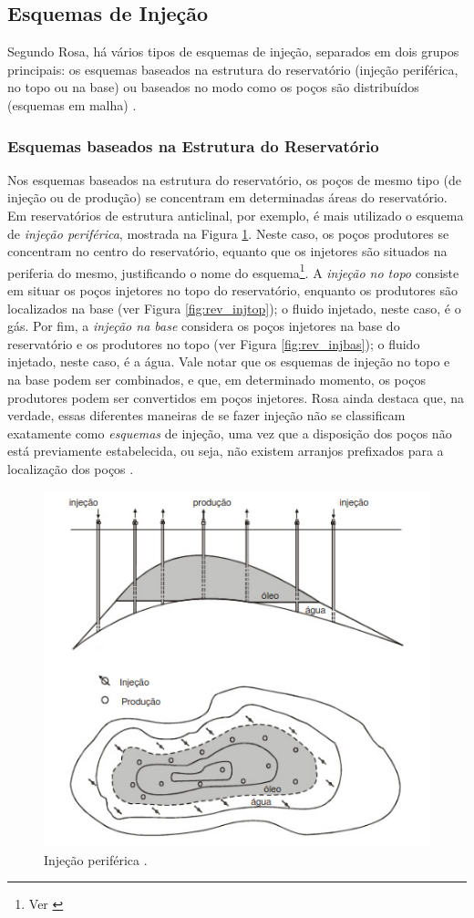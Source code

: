 \subsection{Esquemas de Injeção}
Segundo Rosa, há vários tipos de esquemas de injeção, separados em dois grupos principais: os esquemas baseados na estrutura do reservatório (injeção periférica, no topo ou na base) ou baseados no modo como os poços são distribuídos (esquemas em malha) \cite[p. 564]{engres}.

\subsubsection{Esquemas baseados na Estrutura do Reservatório}
Nos esquemas baseados na estrutura do reservatório, os poços de mesmo tipo (de injeção ou de produção) se concentram em determinadas áreas do reservatório. Em reservatórios de estrutura anticlinal, por exemplo, é mais utilizado o esquema de \textit{injeção periférica}, mostrada na Figura \ref{fig:rev_injper}. Neste caso, os poços produtores se concentram no centro do reservatório, equanto que os injetores são situados na periferia do mesmo, justificando o nome do esquema\footnote{Ver \cite[p. 565]{engres}}. A \textit{injeção no topo} consiste em situar os poços injetores no topo do reservatório, enquanto os produtores são localizados na base (ver Figura \ref{fig:rev_injtop}); o fluido injetado, neste caso, é o gás. Por fim, a \textit{injeção na base} considera os poços injetores na base do reservatório e os produtores no topo (ver Figura \ref{fig:rev_injbas}); o fluido injetado, neste caso, é a água. Vale notar que os esquemas de injeção no topo e na base podem ser combinados, e que, em determinado momento, os poços produtores podem ser convertidos em poços injetores. Rosa ainda destaca que, na verdade, essas diferentes maneiras de se fazer injeção não se classificam exatamente como
\textit{esquemas} de injeção, uma vez que a disposição dos poços não está previamente estabelecida, ou seja, não existem arranjos prefixados para a localização dos poços \cite[p. 566]{engres}.

\begin{figure}[!ht]
\centering
\includegraphics[width=.6\textwidth]{figs/revisao/revisao_injper.png}
\caption{Injeção periférica \cite[p. 565]{engres}.}
\label{fig:rev_injper}
\end{figure}


